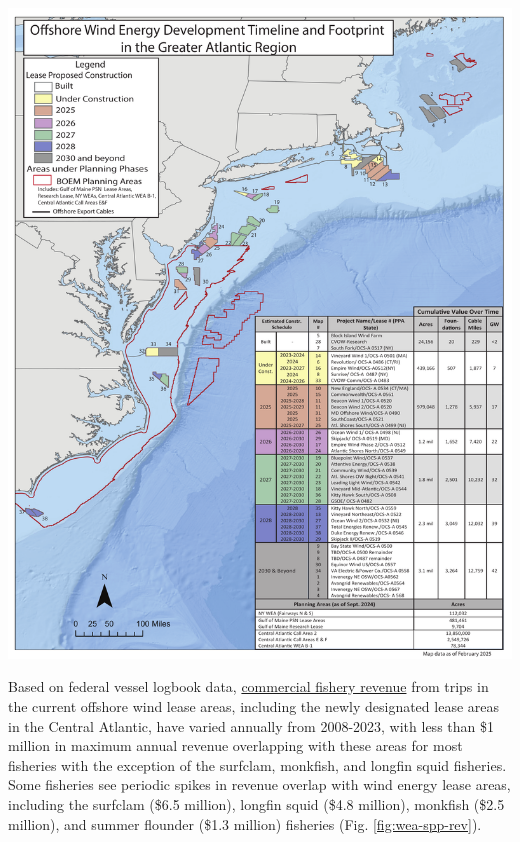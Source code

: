 \documentclass[
  10pt,
]{article}
\let\origfigure\figure
\let\endorigfigure\endfigure
\renewenvironment{figure}[1][2] {
    \expandafter\origfigure\expandafter[H]
} {
    \endorigfigure
}
\begin{document}
\begin{figure}

{\centering \includegraphics[width=0.9\linewidth]{midatlantic_files/figure-latex/wind-dev-cumul-1} 

}

\caption{All Northeast Project areas by year construction ends (each project has a 2 year construction period).}\label{fig:wind-dev-cumul}
\end{figure}

Based on federal vessel logbook data, \href{https://noaa-edab.github.io/catalog/wind_revenue.html}{commercial fishery revenue} from trips in the current offshore wind lease areas, including the newly designated lease areas in the Central Atlantic, have varied annually from 2008-2023, with less than \$1 million in maximum annual revenue overlapping with these areas for most fisheries with the exception of the surfclam, monkfish, and longfin squid fisheries. Some fisheries see periodic spikes in revenue overlap with wind energy lease areas, including the surfclam (\$6.5 million), longfin squid (\$4.8 million), monkfish (\$2.5 million), and summer flounder (\$1.3 million) fisheries (Fig. \ref{fig:wea-spp-rev}).
\end{document}
